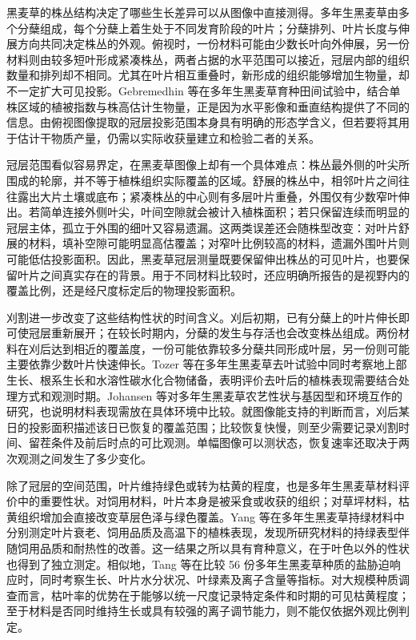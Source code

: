 黑麦草的株丛结构决定了哪些生长差异可以从图像中直接测得。多年生黑麦草由多个分蘖组成，每个分蘖上着生处于不同发育阶段的叶片；分蘖排列、叶片长度与伸展方向共同决定株丛的外观。俯视时，一份材料可能由少数长叶向外伸展，另一份材料则由较多短叶形成紧凑株丛，两者占据的水平范围可以接近，冠层内部的组织数量和排列却不相同。尤其在叶片相互重叠时，新形成的组织能够增加生物量，却不一定扩大可见投影。Gebremedhin 等在多年生黑麦草育种田间试验中，结合单株区域的植被指数与株高估计生物量，正是因为水平影像和垂直结构提供了不同的信息。由俯视图像提取的冠层投影范围本身具有明确的形态学含义，但若要将其用于估计干物质产量，仍需以实际收获量建立和检验二者的关系。

冠层范围看似容易界定，在黑麦草图像上却有一个具体难点：株丛最外侧的叶尖所围成的轮廓，并不等于植株组织实际覆盖的区域。舒展的株丛中，相邻叶片之间往往露出大片土壤或底布；紧凑株丛的中心则有多层叶片重叠，外围仅有少数窄叶伸出。若简单连接外侧叶尖，叶间空隙就会被计入植株面积；若只保留连续而明显的冠层主体，孤立于外围的细叶又容易遗漏。这两类误差还会随株型改变：对叶片舒展的材料，填补空隙可能明显高估覆盖；对窄叶比例较高的材料，遗漏外围叶片则可能低估投影面积。因此，黑麦草冠层测量既要保留伸出株丛的可见叶片，也要保留叶片之间真实存在的背景。用于不同材料比较时，还应明确所报告的是视野内的覆盖比例，还是经尺度标定后的物理投影面积。

刈割进一步改变了这些结构性状的时间含义。刈后初期，已有分蘖上的叶片伸长即可使冠层重新展开；在较长时期内，分蘖的发生与存活也会改变株丛组成。两份材料在刈后达到相近的覆盖度，一份可能依靠较多分蘖共同形成叶层，另一份则可能主要依靠少数叶片快速伸长。Tozer 等在多年生黑麦草去叶试验中同时考察地上部生长、根系生长和水溶性碳水化合物储备，表明评价去叶后的植株表现需要结合处理方式和观测时期。Johansen 等对多年生黑麦草农艺性状与基因型和环境互作的研究，也说明材料表现需放在具体环境中比较。就图像能支持的判断而言，刈后某日的投影面积描述该日已恢复的覆盖范围；比较恢复快慢，则至少需要记录刈割时间、留茬条件及前后时点的可比观测。单幅图像可以测状态，恢复速率还取决于两次观测之间发生了多少变化。

除了冠层的空间范围，叶片维持绿色或转为枯黄的程度，也是多年生黑麦草材料评价中的重要性状。对饲用材料，叶片本身是被采食或收获的组织；对草坪材料，枯黄组织增加会直接改变草层色泽与绿色覆盖。Yang 等在多年生黑麦草持绿材料中分别测定叶片衰老、饲用品质及高温下的植株表现，发现所研究材料的持绿表型伴随饲用品质和耐热性的改善。这一结果之所以具有育种意义，在于叶色以外的性状也得到了独立测定。相似地，Tang 等在比较 56 份多年生黑麦草种质的盐胁迫响应时，同时考察生长、叶片水分状况、叶绿素及离子含量等指标。对大规模种质调查而言，枯叶率的优势在于能够以统一尺度记录特定条件和时期的可见枯黄程度；至于材料是否同时维持生长或具有较强的离子调节能力，则不能仅依据外观比例判定。

